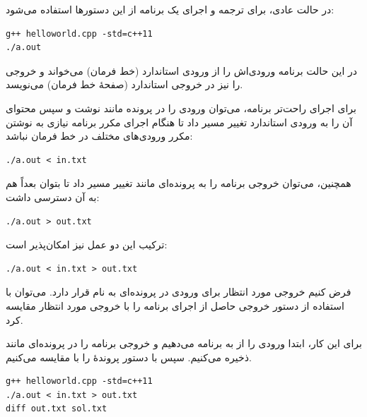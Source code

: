 \documentclass{utap}
\begin{document}
    در حالت عادی، برای ترجمه و اجرای یک برنامه از این دستورها استفاده می‌شود:
    \begin{latin}%
    \begin{Verbatim}[fontsize=\small]
g++ helloworld.cpp -std=c++11
./a.out
    \end{Verbatim}
    \end{latin}

    در این حالت برنامه ورودی‌اش را از ورودی استاندارد  (خط فرمان) می‌خواند و خروجی را نیز در خروجی استاندارد  (صفحهٔ خط فرمان) می‌نویسد.

    برای اجرای راحت‌تر برنامه، می‌توان ورودی را در پرونده مانند  نوشت و سپس محتوای آن را به ورودی استاندارد تغییر مسیر داد تا هنگام اجرای مکرر برنامه نیازی به نوشتن مکرر ورودی‌های مختلف در خط فرمان نباشد:
    \begin{latin}%
    \begin{Verbatim}[fontsize=\small]
./a.out < in.txt
    \end{Verbatim}
    \end{latin}

    همچنین، می‌توان خروجی برنامه را به پرونده‌ای مانند  تغییر مسیر داد تا بتوان بعداً هم به آن دسترسی داشت:
    \begin{latin}%
    \begin{Verbatim}[fontsize=\small]
./a.out > out.txt
    \end{Verbatim}
    \end{latin}

    ترکیب این دو عمل نیز امکان‌پذیر است:
    \begin{latin}%
    \begin{Verbatim}[fontsize=\small]
./a.out < in.txt > out.txt
    \end{Verbatim}
    \end{latin}

    فرض کنیم خروجی مورد انتظار برای ورودی  در پرونده‌ای به نام  قرار دارد. می‌توان با استفاده از دستور  خروجی حاصل از اجرای برنامه را با خروجی مورد انتظار مقایسه کرد.

    برای این کار، ابتدا ورودی را از  به برنامه می‌دهیم و خروجی برنامه را در پرونده‌ای مانند  ذخیره می‌کنیم. سپس با دستور  پروندهٔ  را با  مقایسه می‌کنیم.
    \begin{latin}%
    \begin{Verbatim}[fontsize=\small]
g++ helloworld.cpp -std=c++11
./a.out < in.txt > out.txt
diff out.txt sol.txt
    \end{Verbatim}
    \end{latin}
\end{document}
